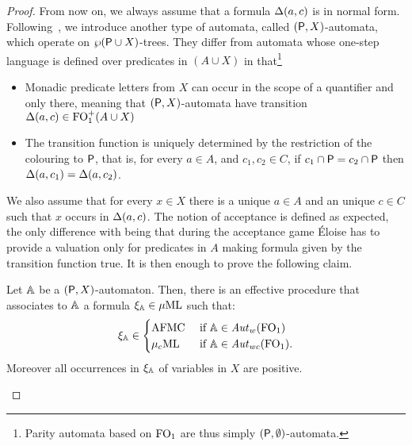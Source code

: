 \begin{proof}
From now on, we always assume that a formula $\Delta(a,c)$ is in normal form. 
Following~\cite{Ven08}, we introduce another type of automata, called $(\mathsf{P},X)$-automata, which operate on $\wp{(\mathsf{P}\cup X)}$-trees.
They differ from automata whose one-step language is defined over predicates in $(A \cup X)$ in that\footnote{Parity automata based on $\mathrm{FO}_1$ are thus simply $(\mathsf{P},\emptyset)$-automata.}
\begin{itemize}
\item Monadic predicate letters from $X$ can occur in the scope of a %
quantifier and only there, meaning that $(\mathsf{P},X)$-automata have transition $\Delta(a,c) \in \mathrm{FO}_1^+(A\cup X)$
%
\item The transition function is uniquely determined by the restriction of the colouring to $\mathsf{P}$, that is, for every $a \in A$, and $c_1, c_2 \in C$, if $c_1 \cap \mathsf{P} = c_2 \cap \mathsf{P}$ then $\Delta(a, c_1)= \Delta(a, c_2)$.
\end{itemize}
We also assume that
for every $x \in X$ there is a unique $a \in A$ and an unique $c \in C$ such that $x$ occurs in $\Delta(a,c)$.
The notion of acceptance is defined as expected, the only difference with being that during the acceptance game \'Eloise has to provide a valuation only for predicates in $A$ making formula given by the transition function true. %
It is then enough to prove the following claim.
\begin{claimfirst}\label{c:1}
Let $\mathbb{A}$ be a $(\mathsf{P},X)$-automaton. Then, there is an effective procedure that associates to $\mathbb{A}$ a formula $\xi_\mathbb{A} \in \mu\mathrm{ML}$ such that:
\begin{equation}\label{eq:c1}
\xi_\aut \in 
\begin{cases}\AFMC &\text{ if }\aut \in \AutW(\ofo) \\
\contAFMC &\text{ if }\aut \in \AutWC(\ofo) 
.
\end{cases}\end{equation}
Moreover all occurrences in $\xi_\mathbb{A}$ of variables in $X$ are positive.
\end{claimfirst}
\begin{pfclaim} %


\end{pfclaim}
\end{proof}
